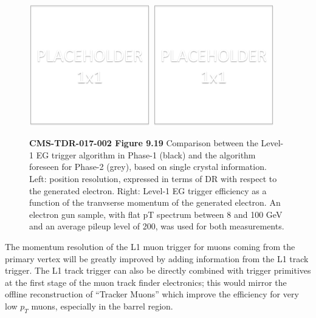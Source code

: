 \begin{figure}[hbtp]\begin{center}
\includegraphics[width=0.47\textwidth]{figures/placeholder.png}
\includegraphics[width=0.47\textwidth]{figures/placeholder.png}
\caption{ \textbf{CMS-TDR-017-002 Figure 9.19} Comparison between the Level-1 EG trigger algorithm in Phase-1 (black) and the
algorithm foreseen for Phase-2 (grey), based on single crystal information. Left: position resolution,
expressed in terms of DR with respect to the generated electron. Right: Level-1 EG
trigger efficiency as a function of the tranvserse momentum of the generated electron. An electron
gun sample, with flat pT spectrum between 8 and 100 GeV and an average pileup level of
200, was used for both measurements.
}
\label{fig:cmsL1el}
\end{center}
\end{figure}


The momentum resolution of the L1 muon trigger for muons coming from the primary vertex
will be greatly improved by adding information from the L1 track trigger. 
The L1 track trigger can also be directly combined with trigger primitives at the first stage of the muon
track finder electronics; this would mirror the offline reconstruction of ``Tracker Muons'' which
improve the efficiency for very low $p_T$ muons, especially in the barrel region.


